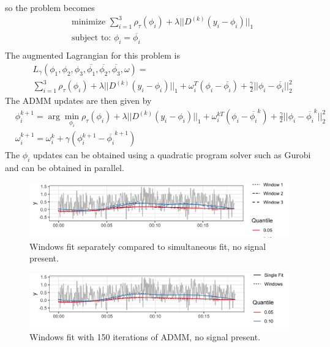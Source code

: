 \documentclass[12pt]{article}
\begin{document}
	so the problem becomes
	\begin{align}
	&\text{minimize } \sum_{i=1}^3 \rho_\tau(\phi_i) + \lambda||D^{(k)}(y_i-\phi_i)||_1\\
	&\text{subject to: } \phi_{i}=\overline{\phi_i}\\
	\end{align}
	The augmented Lagrangian for this problem is 
	\begin{align}
	&L_\gamma(\phi_1,\phi_2, \phi_3, \overline{\phi_1}, \overline{\phi_2}, \overline{\phi_3}, \omega) = \\
	&\sum_{i=1}^3 \rho_\tau(\phi_i) + \lambda||D^{(k)}(y_i-\phi_i)||_1 + \omega_i^T(\phi_i - \overline{\phi_i}) + \frac{\gamma}{2}||\phi_i - \overline{\phi_i}||_2^2
	\end{align}
	The ADMM updates are then given by
	\begin{align}
	&\phi_i^{k+1} = \arg\min_{\phi_i}\rho_\tau(\phi_i) + \lambda||D^{(k)}(y_i-\phi_i)||_1 + \omega_i^{kT}(\phi_i - \overline{\phi_i}^k) + \frac{\gamma}{2}||\phi_i - \overline{\phi_i}^k||_2^2\\
	&\omega_i^{k+1} = \omega_i^{k} + \gamma(\phi_i^{k+1} - \overline{\phi_i}^{k+1})
	\end{align}
	The $\phi_i$ updates can be obtained using a quadratic program solver such as Gurobi and can be obtained in parallel. 
	
	\pagebreak 
	
	\begin{figure}[!h] 
		\caption{Windows fit separately compared to simultaneous fit, no signal present.}
		\includegraphics[width = \linewidth]{Figures/overlapping_windows.png}
	\end{figure}
	
	\begin{figure}[!h] 
		\caption{Windows fit with 150 iterations of ADMM, no signal present.}
		\includegraphics[width = \linewidth]{Figures/admm_windows.png}
	\end{figure}
	
\end{document}
